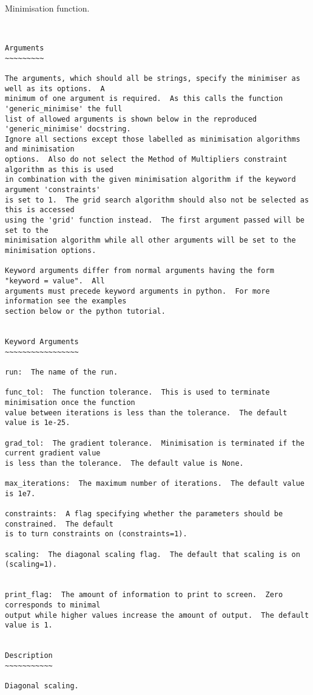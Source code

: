 Minimisation function.
\scriptsize
\begin{verbatim}


Arguments
~~~~~~~~~

The arguments, which should all be strings, specify the minimiser as well as its options.  A
minimum of one argument is required.  As this calls the function 'generic_minimise' the full
list of allowed arguments is shown below in the reproduced 'generic_minimise' docstring.
Ignore all sections except those labelled as minimisation algorithms and minimisation
options.  Also do not select the Method of Multipliers constraint algorithm as this is used
in combination with the given minimisation algorithm if the keyword argument 'constraints'
is set to 1.  The grid search algorithm should also not be selected as this is accessed
using the 'grid' function instead.  The first argument passed will be set to the
minimisation algorithm while all other arguments will be set to the minimisation options.

Keyword arguments differ from normal arguments having the form "keyword = value".  All
arguments must precede keyword arguments in python.  For more information see the examples
section below or the python tutorial.


Keyword Arguments
~~~~~~~~~~~~~~~~~

run:  The name of the run.

func_tol:  The function tolerance.  This is used to terminate minimisation once the function
value between iterations is less than the tolerance.  The default value is 1e-25.

grad_tol:  The gradient tolerance.  Minimisation is terminated if the current gradient value
is less than the tolerance.  The default value is None.

max_iterations:  The maximum number of iterations.  The default value is 1e7.

constraints:  A flag specifying whether the parameters should be constrained.  The default
is to turn constraints on (constraints=1).

scaling:  The diagonal scaling flag.  The default that scaling is on (scaling=1).


print_flag:  The amount of information to print to screen.  Zero corresponds to minimal
output while higher values increase the amount of output.  The default value is 1.


Description
~~~~~~~~~~~

Diagonal scaling.


\end{verbatim}
